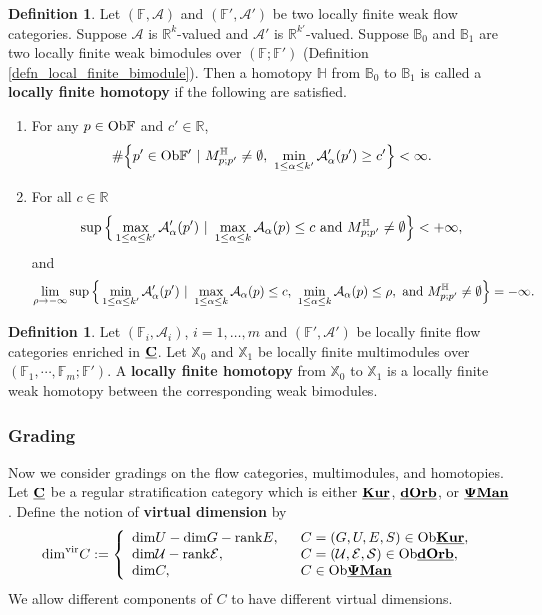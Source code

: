 \documentclass[reqno, 10pt]{amsart}
\numberwithin{equation}{section}
\numberwithin{equation}{section}
\theoremstyle{definition}
\newtheorem{defn}[thm]{Definition}
\theoremstyle{remark}
\newcommand{\beqn}{\begin{equation*}}
\newcommand{\eeqn}{\end{equation*}}
\newcommand{\mb}{\mathbb}
\newcommand{\mc}{\mathcal}
\newcommand{\pman}{\uds{{\bf \Psi}{\bf Man}}}
\newcommand{\uds}[1]{\underline{\smash{#1}}}
\begin{document}
\begin{defn}\label{defn_Novikov_homotopy}
Let $({\mb F}, {\mc A})$ and $({\mb F}', {\mc A}')$ be two locally finite weak flow categories. Suppose ${\mc A}$ is ${\mb R}^k$-valued and ${\mc A}'$ is ${\mb R}^{k'}$-valued. Suppose ${\mb B}_0$ and ${\mb B}_1$ are two locally finite weak bimodules over $({\mb F}; {\mb F}')$ (Definition \ref{defn_local_finite_bimodule}). Then a homotopy ${\mb H}$ from ${\mb B}_0$ to ${\mb B}_1$ is called a {\bf locally finite homotopy} if the following are satisfied.
\begin{enumerate}

\item For any $p \in {\rm Ob}{\mb F}$ and $c' \in {\mb R}$,
\beqn
\# \Big\{ p' \in {\rm Ob}{\mb F}'\ |\ M_{p; p'}^{\mb H} \neq \emptyset,\  \min_{1 \leq \alpha \leq k'} {\mc A}_\alpha'(p') \geq c' \Big\} < \infty.
\eeqn


\item For all $c \in {\mb R}$
\beqn
 \sup \Big\{ \max_{1 \leq \alpha \leq k'} {\mc A}_\alpha'(p')\ |\ \max_{1 \leq \alpha \leq k} {\mc A}_\alpha(p) \leq c\ {\rm and}\ M_{p;p'}^{\mb H} \neq \emptyset \Big\} < +\infty,
\eeqn
and
\beqn
\lim_{\rho \to -\infty} \sup \Big\{ \min_{1 \leq \alpha \leq k'} {\mc A}_\alpha'(p')\ |\ \max_{1 \leq \alpha \leq k}{\mc A}_\alpha(p) \leq c,\ \min_{1 \leq \alpha \leq k} {\mc A}_\alpha(p) \leq \rho,\ {\rm and}\ M_{p;p'}^{\mb H} \neq \emptyset \Big\}  = -\infty.
\eeqn

\end{enumerate}
\end{defn}

\begin{defn}
Let $({\mb F}_i, {\mc A}_i)$, $i=1, \ldots, m$ and $({\mb F}', {\mc A}')$ be locally finite flow categories enriched in $\uds{\bf C}$. Let ${\mb X}_0$ and ${\mb X}_1$ be locally finite multimodules over $({\mb F}_1, \cdots, {\mb F}_m; {\mb F}')$. A {\bf locally finite homotopy} from ${\mb X}_0$ to ${\mb X}_1$ is a locally finite weak homotopy between the corresponding weak bimodules.  
\end{defn}






\subsubsection{Grading}

Now we consider gradings on the flow categories, multimodules, and homotopies. Let $\uds{\bf C}$ be a regular stratification category which is either $\uds{\bf Kur}$, $\uds{\bf dOrb}$, or $\pman$. Define the notion of {\bf virtual dimension} by
\beqn
{\rm dim}^{\rm vir} C:= \left\{ \begin{array}{ll} {\rm dim} U - {\rm dim} G - {\rm rank} E,\ &\  C = (G, U, E, S) \in {\rm Ob} \uds{\bf Kur},\\
{\rm dim} {\mc U} - {\rm rank} {\mc E},\ &\ C = ({\mc U}, {\mc E}, {\mc S}) \in {\rm Ob} \uds{\bf dOrb},\\
{\rm dim} C,\ &\ C \in {\rm Ob} \pman
\end{array}\right. 
\eeqn
We allow different components of $C$ to have different virtual dimensions. 
\end{document}
